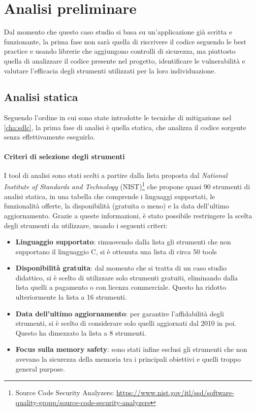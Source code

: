 \section{Analisi preliminare}
\label{sec:initial_analysis}

Dal momento che questo caso studio si basa su un'applicazione già scritta e funzionante,
la prima fase non sarà quella di riscrivere il codice seguendo le best practice
e usando librerie che aggiungono controlli di sicurezza, ma piuttosto quella di analizzare
il codice presente nel progetto, identificare le vulnerabilità e valutare l'efficacia
degli strumenti utilizzati per la loro individuazione.

\subsection*{Analisi statica}
Seguendo l'ordine in cui sono state introdotte le tecniche di mitigazione nel
\autoref{cha:sdlc}, la prima fase di analisi è quella statica, che analizza il
codice sorgente senza effettivamente eseguirlo.

\paragraph{Criteri di selezione degli strumenti}
I tool di analisi sono stati scelti a partire dalla lista proposta dal \textit{National
Institute of Standards and Technology} (NIST)\footnote{Source Code Security
Analyzers: \url{https://www.nist.gov/itl/ssd/software-quality-group/source-code-security-analyzers}}
che propone quasi 90 strumenti di analisi statica, in una tabella che comprende
i linguaggi supportati, le funzionalità offerte, la disponibilità (gratuita o meno)
e la data dell'ultimo aggiornamento. Grazie a queste informazioni, è stato
possibile restringere la scelta degli strumenti da utilizzare, usando i seguenti
criteri:
\begin{itemize}
  \item \textbf{Linguaggio supportato}: rimuovendo dalla lista gli strumenti che
    non supportano il linguaggio C, si è ottenuta una lista di circa 50 tools

  \item \textbf{Disponibilità gratuita}: dal momento che si tratta di un caso studio
    didattico, si è scelto di utilizzare solo strumenti gratuiti, eliminando dalla
    lista quelli a pagamento o con licenza commerciale. Questo ha ridotto
    ulteriormente la lista a 16 strumenti.

  \item \textbf{Data dell'ultimo aggiornamento}: per garantire l'affidabilità degli
    strumenti, si è scelto di considerare solo quelli aggiornati dal 2010 in poi.
    Questo ha dimezzato la lista a 8 strumenti.

  \item \textbf{Focus sulla memory safety}: sono stati infine esclusi gli strumenti
    che non avevano la sicurezza della memoria tra i principali obiettivi e quelli
    troppo general purpose.
\end{itemize}

